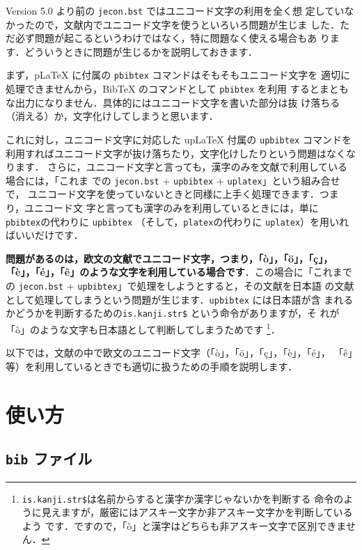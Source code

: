 \documentclass{ltjsarticle}
\begin{document}
Version 5.0 より前の \texttt{jecon.bst} ではユニコード文字の利用を全く想
定していなかったので，文献内でユニコード文字を使うといろいろ問題が生じま
した．ただ必ず問題が起こるというわけではなく，特に問題なく使える場合もあ
ります．どういうときに問題が生じるかを説明しておきます．

\vspace*{1em}

まず，pLaTeX に付属の \texttt{pbibtex} コマンドはそもそもユニコード文字を
適切に処理できませんから，BibTeX のコマンドとして \texttt{pbibtex} を利用
するとまともな出力になりません．具体的にはユニコード文字を書いた部分は抜
け落ちる（消える）か，文字化けしてしまうと思います．

これに対し，ユニコード文字に対応した upLaTeX 付属の \texttt{upbibtex} コマンドを
利用すればユニコード文字が抜け落ちたり，文字化けしたりという問題はなくなります．
さらに，ユニコード文字と言っても，漢字のみを文献で利用している場合には，「これま
での \texttt{jecon.bst} + \texttt{upbibtex} + \texttt{uplatex}」という組み合せで，
ユニコード文字を使っていないときと同様に上手く処理できます．つまり，ユニコード文
字と言っても漢字のみを利用しているときには，単に \texttt{pbibtex}の代わりに
\texttt{upbibtex} （そして，\texttt{platex}の代わりに \texttt{uplatex}）を用いれ
ばいいだけです．

\textbf{問題があるのは，欧文の文献でユニコード文字，つまり，「ò」，「ö」，「ç」，
「è」，「é」，「ê」のような文字を利用している場合です}．この場合に「これまでの
\texttt{jecon.bst} + \texttt{upbibtex}」で処理をしようとすると，その文献を日本語
の文献として処理してしまうという問題が生じます．\texttt{upbibtex} には日本語が含
まれるかどうかを判断するための\texttt{is.kanji.str\$} という命令がありますが，そ
れが「ò」のような文字も日本語として判断してしまうためです
\footnote{\texttt{is.kanji.str\$}は名前からすると漢字か漢字じゃないかを判断する
命令のように見えますが，厳密にはアスキー文字か非アスキー文字かを判断しているよう
です．ですので，「ò」と漢字はどちらも非アスキー文字で区別できません．}．

\vspace*{1em}

以下では，文献の中で欧文のユニコード文字（「ò」，「ö」，「ç」，「è」，「é」，
「ê」等）を利用しているときでも適切に扱うための手順を説明します．

\section{使い方}

\subsection{\texttt{bib} ファイル}
\end{document}
